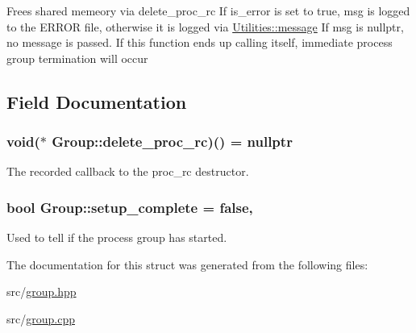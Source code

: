 Frees shared memeory via delete\+\_\+proc\+\_\+rc If is\+\_\+error is set to true, msg is logged to the E\+R\+R\+OR file, otherwise it is logged via \hyperlink{class_utilities_a0e46f2da74b1069eb9df671efed9180d}{Utilities\+::message} If msg is nullptr, no message is passed. If this function ends up calling itself, immediate process group termination will occur 

\subsection{Field Documentation}
\subsubsection[{\texorpdfstring{delete\+\_\+proc\+\_\+rc}{delete_proc_rc}}]{\setlength{\rightskip}{0pt plus 5cm}void($\ast$ Group\+::delete\+\_\+proc\+\_\+rc)() = nullptr\hspace{0.3cm}{\ttfamily [static]}}\hypertarget{struct_group_a737564dd9819ea8050f6f3019c550da2}{}\label{struct_group_a737564dd9819ea8050f6f3019c550da2}


The recorded callback to the proc\+\_\+rc destructor. 

\subsubsection[{\texorpdfstring{setup\+\_\+complete}{setup_complete}}]{\setlength{\rightskip}{0pt plus 5cm}bool Group\+::setup\+\_\+complete = false\hspace{0.3cm}{\ttfamily [static]}, {\ttfamily [private]}}\hypertarget{struct_group_a35632ca452cfe09fbf723539cd264f58}{}\label{struct_group_a35632ca452cfe09fbf723539cd264f58}


Used to tell if the process group has started. 



The documentation for this struct was generated from the following files\+:\begin{DoxyCompactItemize}
\item 
src/\hyperlink{group_8hpp}{group.\+hpp}\item 
src/\hyperlink{group_8cpp}{group.\+cpp}\end{DoxyCompactItemize}
